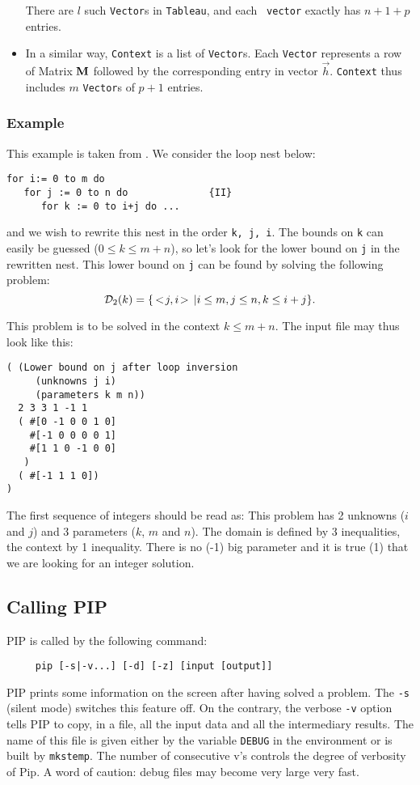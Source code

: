 \documentclass[12pt,a4paper,dvips]{article}
\newcommand{\pair}[2]{\,<\!#1,#2\!>\,}
\begin{document}
\begin{itemize}
There are $l$ such {\tt Vector}s in {\tt Tableau}, and each {\tt
vector} exactly has $n+1+p$ entries.


\item In a similar way, {\tt Context} is a list of {\tt Vector}s. Each {\tt Vector} represents a row of Matrix ${\bf M}$ followed by the
corresponding entry in vector $\vec{h}$. {\tt Context} thus includes
$m$ {\tt Vector}s of $p + 1$ entries.

\end{itemize}



\subsubsection{Example} \label{exp2}
This example is taken from \cite{Feau:88c}. We consider the loop nest below:
\begin{verbatim}
for i:= 0 to m do
   for j := 0 to n do              {II}
      for k := 0 to i+j do ...
\end{verbatim}
and we wish to rewrite this nest in the order {\tt k, j, i}. The
bounds on {\tt k} can easily be guessed ($0\leq k \leq m+n$), so let's
look for the lower bound on {\tt j} in the rewritten nest. This lower bound on
{\tt j} can be found by solving the following problem:
\[ {\cal D}_{2}(k) = \{\pair{j}{i} | i \leq m, j \leq n, k \leq i + j\} .\]

This problem is to be solved in the context $k \leq m+n$. The input file
may thus look like this:
\begin{verbatim}
( (Lower bound on j after loop inversion
     (unknowns j i)
     (parameters k m n))
  2 3 3 1 -1 1
  ( #[0 -1 0 0 1 0]
    #[-1 0 0 0 0 1]
    #[1 1 0 -1 0 0]
   )
  ( #[-1 1 1 0])
)
\end{verbatim}
The first sequence of integers should be read as: This problem has 2
unknowns ($i$ and $j$) and 3 parameters ($k$, $m$ and $n$). The domain is
defined by 3 inequalities, the context by 1 inequality. There is no
(-1) big parameter and it is true (1) that we are looking for an
integer solution.

\subsection{Calling PIP}
PIP is called by the following command:
\begin{verbatim}
     pip [-s|-v...] [-d] [-z] [input [output]]
\end{verbatim}
PIP prints some information on the screen after having solved a
problem. The {\tt -s} (silent mode) switches this feature off. On the
contrary, the verbose {\tt -v} option tells PIP to copy, in a file,
all the input data and all the intermediary results. The name of this
file is given either by the variable {\tt DEBUG} in the environment or
is built by {\tt mkstemp}. The number of consecutive v's controls the
degree of verbosity of Pip. A word of caution: debug files may become
very large very fast.
\end{document}
